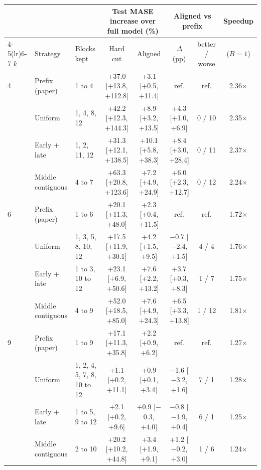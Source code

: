 \begin{tabular}{lllccccc}
\toprule
 & & & \multicolumn{2}{c}{Test MASE increase over full model (\%)} & \multicolumn{2}{c}{Aligned vs prefix} & Speedup \\
\cmidrule(lr){4-5}\cmidrule(lr){6-7}
$k$ & Strategy & Blocks kept & Hard cut & Aligned & $\Delta$ (pp) & better / worse & ($B{=}1$) \\
\midrule
4 & Prefix (paper) & 1 to 4 & +37.0 [+13.8, +112.8] & +3.1 [+0.5, +11.4] & ref. & ref. & 2.36$\times$ \\
 & Uniform & 1, 4, 8, 12 & +42.2 [+12.3, +144.3] & +8.9 [+3.2, +13.5] & +4.3 [+1.0, +6.9] & 0 / 10 & 2.35$\times$ \\
 & Early + late & 1, 2, 11, 12 & +31.3 [+12.1, +138.5] & +10.1 [+5.8, +38.3] & +8.4 [+3.0, +28.4] & 0 / 11 & 2.37$\times$ \\
 & Middle contiguous & 4 to 7 & +63.3 [+20.8, +123.6] & +7.2 [+4.9, +24.9] & +6.0 [+2.3, +12.7] & 0 / 12 & 2.24$\times$ \\
\midrule
6 & Prefix (paper) & 1 to 6 & +20.1 [+11.3, +48.0] & +2.3 [+0.4, +11.5] & ref. & ref. & 1.72$\times$ \\
 & Uniform & 1, 3, 5, 8, 10, 12 & +17.5 [+11.9, +30.1] & +4.2 [+1.5, +9.5] & $-$0.7 [$-$2.4, +1.5] & 4 / 4 & 1.76$\times$ \\
 & Early + late & 1 to 3, 10 to 12 & +23.1 [+6.9, +50.6] & +7.6 [+2.2, +13.2] & +3.7 [+0.3, +8.3] & 1 / 7 & 1.75$\times$ \\
 & Middle contiguous & 4 to 9 & +52.0 [+18.5, +85.0] & +7.6 [+4.9, +24.3] & +6.5 [+3.3, +13.8] & 1 / 12 & 1.81$\times$ \\
\midrule
9 & Prefix (paper) & 1 to 9 & +17.1 [+11.3, +35.8] & +2.2 [+0.9, +6.2] & ref. & ref. & 1.27$\times$ \\
 & Uniform & 1, 2, 4, 5, 7, 8, 10 to 12 & +1.1 [+0.2, +11.1] & +0.9 [+0.1, +3.4] & $-$1.6 [$-$3.2, +1.6] & 7 / 1 & 1.28$\times$ \\
 & Early + late & 1 to 5, 9 to 12 & +2.1 [+0.2, +9.6] & +0.9 [$-$0.3, +4.0] & $-$0.8 [$-$1.9, +0.4] & 6 / 1 & 1.25$\times$ \\
 & Middle contiguous & 2 to 10 & +20.2 [+10.2, +44.8] & +3.4 [+1.9, +9.1] & +1.2 [$-$0.2, +3.0] & 1 / 6 & 1.24$\times$ \\
\bottomrule
\end{tabular}
